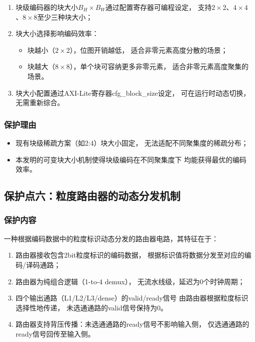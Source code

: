 \documentclass[a4paper,12pt,fontset=ubuntu]{ctexart}
\begin{document}
\begin{enumerate}
  \item 块级编码器的块大小$B_H \times B_W$通过配置寄存器可编程设定，
        支持$2 \times 2$、$4 \times 4$、$8 \times 8$至少三种块大小；

  \item 块大小选择影响编码效率：
        \begin{itemize}
          \item 块越小（$2 \times 2$），位图开销越低，
                适合非零元素高度分散的场景；
          \item 块越大（$8 \times 8$），单个块可容纳更多非零元素，
                适合非零元素高度聚集的场景。
        \end{itemize}

  \item 块大小配置通过AXI-Lite寄存器cfg\_block\_size设定，
        可在运行时动态切换，无需重新综合。
\end{enumerate}

\subsubsection{保护理由}

\begin{itemize}
  \item 现有块级稀疏方案（如2:4）块大小固定，
        无法适配不同聚集度的稀疏分布；
  \item 本发明的可变块大小机制使得块级编码在不同聚集度下
        均能获得最优的编码效率。
\end{itemize}

\subsection{保护点六：粒度路由器的动态分发机制}

\subsubsection{保护内容}

一种根据编码数据中的粒度标识动态分发的路由器电路，其特征在于：

\begin{enumerate}
  \item 路由器接收包含2bit粒度标识的编码数据，
        根据标识值将数据分发至对应的编码/译码通路；

  \item 路由器为纯组合逻辑（1-to-4 demux），
        无流水线级，延迟为0个时钟周期；

  \item 四个输出通路（L1/L2/L3/dense）的valid/ready信号
        由路由器根据粒度标识选择性地传递，
        未选通通路的valid信号保持为0。

  \item 路由器支持背压传播：未选通通路的ready信号不影响输入侧，
        仅选通通路的ready信号回传至输入侧。
\end{enumerate}
\end{document}

